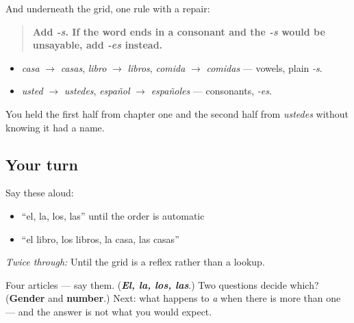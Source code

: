 \begin{grammarlens}[title={Grammar Lens: the two plural rules}]
And underneath the grid, one rule with a repair:

\begin{quote}
\textbf{Add \emph{-s}. If the word ends in a consonant and the \emph{-s} would be unsayable, add \emph{-es} instead.}
\end{quote}

\begin{itemize}
\raggedright
  \item \emph{casa} $\to$ \emph{casas}, \emph{libro} $\to$ \emph{libros}, \emph{comida} $\to$ \emph{comidas} — vowels, plain \emph{-s}.
  \item \emph{usted} $\to$ \emph{ustedes}, \emph{español} $\to$ \emph{españoles} — consonants, \emph{-es}.
\end{itemize}

You held the first half from chapter one and the second half from \emph{ustedes} without knowing it had a name.
\end{grammarlens}

\subsection*{Your turn}
Say these aloud:

\begin{itemize}
\raggedright
  \item \textquotedblleft{}el, la, los, las\textquotedblright{} until the order is automatic
  \item \textquotedblleft{}el libro, los libros, la casa, las casas\textquotedblright{}
\end{itemize}

\emph{Twice through:} Until the grid is a reflex rather than a lookup.

\begin{tcolorbox}[breakable,colback=teal!4,colframe=teal!35!black,title={Before you move on}]
Four articles — say them. (\emph{\textbf{El, la, los, las}}.) Two questions decide which? (\textbf{Gender} and \textbf{number}.) Next: what happens to \emph{a} when there is more than one — and the answer is not what you would expect.
\end{tcolorbox}
